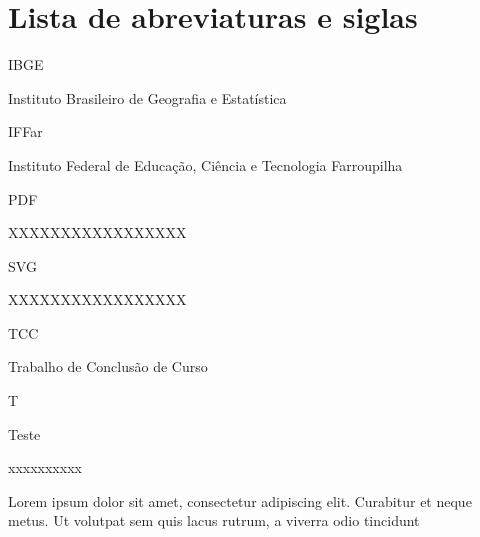 \newcommand\siglaLargura{10ex} %
\newcommand\siglaGap{1ex} %
\newcommand\nomeSiglaLargura{\dimexpr\linewidth-\siglaLargura-\siglaGap\relax}
\newcommand\sigla[2]{\noindent\parbox[t]{\siglaLargura}{#1\strut}%
  \hspace{\siglaGap}%
  \parbox[t]{\nomeSiglaLargura}{#2\strut}}

\chapter*{Lista de abreviaturas e siglas}
\thispagestyle{empty}

\sigla{IBGE}{Instituto Brasileiro de Geografia e Estatística}

\sigla{IFFar}{Instituto Federal de Educação, Ciência e Tecnologia Farroupilha}

\sigla{PDF}{XXXXXXXXXXXXXXXXX}

\sigla{SVG}{XXXXXXXXXXXXXXXXX}

\sigla{TCC}{Trabalho de Conclusão de Curso}

\sigla{T}{Teste}

\sigla{xxxxxxxxxx}{Lorem ipsum dolor sit amet, consectetur adipiscing elit. Curabitur et neque metus. Ut volutpat sem quis lacus rutrum, a viverra odio tincidunt}